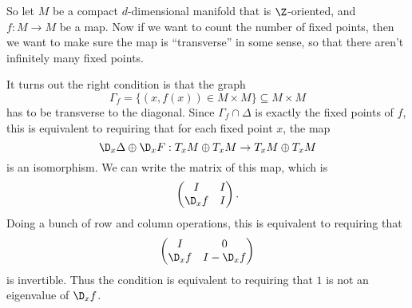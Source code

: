 \documentclass[a4paper]{article}
\begin{document}
So let $M$ be a compact $d$-dimensional manifold that is $\Z$-oriented, and $f: M \to M$ be a map. Now if we want to count the number of fixed points, then we want to make sure the map is ``transverse'' in some sense, so that there aren't infinitely many fixed points.

It turns out the right condition is that the graph
\[
  \Gamma_f = \{(x, f(x)) \in M \times M\} \subseteq M \times M
\]
has to be transverse to the diagonal. Since $\Gamma_f \cap \Delta$ is exactly the fixed points of $f$, this is equivalent to requiring that for each fixed point $x$, the map
\[
  \D_x \Delta \oplus \D_x F: T_x M \oplus T_x M \to T_x M \oplus T_x M
\]
is an isomorphism. We can write the matrix of this map, which is
\[
  \begin{pmatrix}
    I & I\\
    \D_x f & I
  \end{pmatrix}.
\]
Doing a bunch of row and column operations, this is equivalent to requiring that
\[
  \begin{pmatrix}
    I & 0\\
    \D_x f & I - \D_x f
  \end{pmatrix}
\]
is invertible. Thus the condition is equivalent to requiring that $1$ is not an eigenvalue of $\D_x f$.
\end{document}

